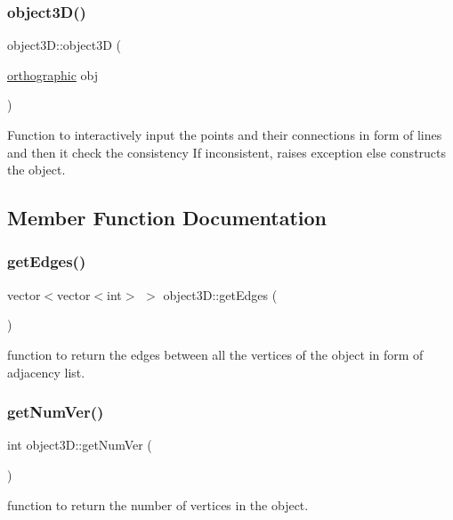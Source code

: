 \subsubsection{\texorpdfstring{object3\+D()}{object3D()}\hspace{0.1cm}{\footnotesize\ttfamily [3/3]}}
{\footnotesize\ttfamily object3\+D\+::object3D (\begin{DoxyParamCaption}\item[{\mbox{\hyperlink{classorthographic}{orthographic}}}]{obj }\end{DoxyParamCaption})}

Function to interactively input the points and their connections in form of lines and then it check the consistency If inconsistent, raises exception else constructs the object. 

\subsection{Member Function Documentation}
\mbox{\label{classobject3D_a4ed285050b7a9def183cbba66766934d}} 
\subsubsection{\texorpdfstring{get\+Edges()}{getEdges()}}
{\footnotesize\ttfamily vector$<$vector$<$int$>$ $>$ object3\+D\+::get\+Edges (\begin{DoxyParamCaption}{ }\end{DoxyParamCaption})}

function to return the edges between all the vertices of the object in form of adjacency list. \mbox{\label{classobject3D_aeb34ac3e26a3c7a8190f2abadfaa370a}} 
\subsubsection{\texorpdfstring{get\+Num\+Ver()}{getNumVer()}}
{\footnotesize\ttfamily int object3\+D\+::get\+Num\+Ver (\begin{DoxyParamCaption}{ }\end{DoxyParamCaption})}

function to return the number of vertices in the object. \mbox{\label{classobject3D_a9b0407c5b8444f840d3bebaf3deac07f}} 
